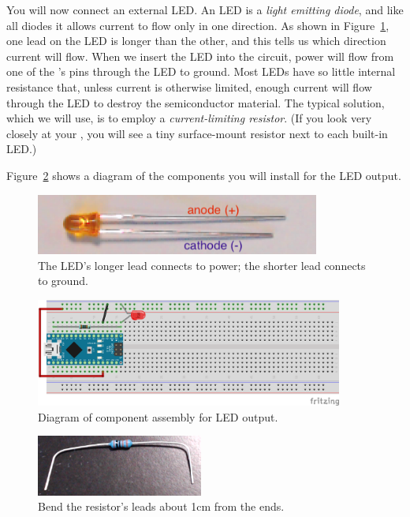 You will now connect an external LED. An LED is a \textit{light emitting diode}, and like all diodes it allows current to flow only in one direction.
As shown in Figure~\ref{fig:led-annotated}, one lead on the LED is longer than the other, and this tells us which direction current will flow.
When we insert the LED into the circuit, power will flow from one of the \developmentboard's pins through the LED to ground.
Most LEDs have so little internal resistance that, unless current is otherwise limited, enough current will flow through the LED to destroy the semiconductor material.
The typical solution, which we will use, is to employ a \textit{current-limiting resistor}.
(If you look very closely at your \developmentboard, you will see a tiny surface-mount resistor next to each built-in LED.)

Figure~\ref{fig:led-diagram} shows a diagram of the components you will install for the LED output.

\begin{figure}
    \centering
    \includegraphics[height=2cm]{direct/led/led-annotated}
    \caption{The LED's longer lead connects to power; the shorter lead connects to ground.\label{fig:led-annotated}}
\end{figure}

\begin{figure}[p]
    \centering
    \includegraphics[width=0.9\textwidth]{fritzing_diagrams/led}
    \caption{Diagram of component assembly for LED output. \label{fig:led-diagram}}
\end{figure}

\begin{figure}[p]
    \centering
    \includegraphics[height=2cm]{direct/led/resistor-bent}
    \caption{Bend the resistor's leads about 1cm from the ends.\label{fig:resistor-bent}}
\end{figure}

